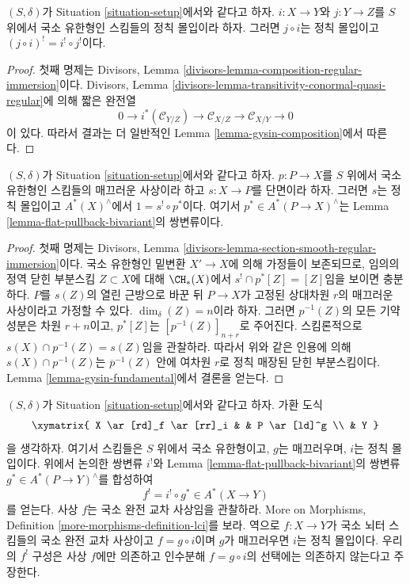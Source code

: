 \begin{lemma}
\label{lemma-composition-regular-immersion}
$(S, \delta)$가 Situation \ref{situation-setup}에서와 같다고 하자.
$i : X \to Y$와 $j : Y \to Z$를 $S$ 위에서 국소 유한형인 스킴들의
정칙 몰입이라 하자. 그러면 $j \circ i$는 정칙 몰입이고
$(j \circ i)^! = i^! \circ j^!$이다.
\end{lemma}

\begin{proof}
첫째 명제는 Divisors, Lemma
\ref{divisors-lemma-composition-regular-immersion}이다. Divisors,
Lemma \ref{divisors-lemma-transitivity-conormal-quasi-regular}에 의해
짧은 완전열
$$
0 \to
i^*(\mathcal{C}_{Y/Z}) \to
\mathcal{C}_{X/Z} \to
\mathcal{C}_{X/Y} \to 0
$$
이 있다. 따라서 결과는 더 일반적인 Lemma
\ref{lemma-gysin-composition}에서 따른다.
\end{proof}

\begin{lemma}
\label{lemma-section-smooth}
$(S, \delta)$가 Situation \ref{situation-setup}에서와 같다고 하자.
$p : P \to X$를 $S$ 위에서 국소 유한형인 스킴들의 매끄러운 사상이라
하고 $s : X \to P$를 단면이라 하자. 그러면 $s$는 정칙 몰입이고
$A^*(X)^\wedge$에서 $1 = s^! \circ p^*$이다. 여기서
$p^* \in A^*(P \to X)^\wedge$는 Lemma
\ref{lemma-flat-pullback-bivariant}의 쌍변류이다.
\end{lemma}

\begin{proof}
첫째 명제는 Divisors, Lemma
\ref{divisors-lemma-section-smooth-regular-immersion}이다. 국소 유한형인
밑변환 $X' \to X$에 의해 가정들이 보존되므로, 임의의 정역 닫힌
부분스킴 $Z \subset X$에 대해 $\CH_*(X)$에서
$s^! \cap p^*[Z] = [Z]$임을 보이면 충분하다. $P$를 $s(Z)$의 열린
근방으로 바꾼 뒤 $P \to X$가 고정된 상대차원 $r$의 매끄러운 사상이라고
가정할 수 있다. $\dim_\delta(Z) = n$이라 하자. 그러면
$p^{-1}(Z)$의 모든 기약 성분은 차원 $r + n$이고, $p^*[Z]$는
$[p^{-1}(Z)]_{n + r}$로 주어진다. 스킴론적으로
$s(X) \cap p^{-1}(Z) = s(Z)$임을 관찰하라. 따라서 위와 같은 인용에
의해 $s(X) \cap p^{-1}(Z)$는 $\overline{p}^{-1}(Z)$ 안에 여차원 $r$로
정칙 매장된 닫힌 부분스킴이다. Lemma
\ref{lemma-gysin-fundamental}에서 결론을 얻는다.
\end{proof}

\noindent
$(S, \delta)$가 Situation \ref{situation-setup}에서와 같다고 하자.
가환 도식
$$
\xymatrix{
X \ar[rd]_f \ar[rr]_i & & P \ar[ld]^g \\
& Y
}
$$
을 생각하자. 여기서 스킴들은 $S$ 위에서 국소 유한형이고, $g$는
매끄러우며, $i$는 정칙 몰입이다. 위에서 논의한 쌍변류 $i^!$와 Lemma
\ref{lemma-flat-pullback-bivariant}의 쌍변류
$g^* \in A^*(P \to Y)^\wedge$를 합성하여
$$
f^! = i^! \circ g^* \in A^*(X \to Y)
$$
를 얻는다. 사상 $f$는 국소 완전 교차 사상임을 관찰하라. More on
Morphisms, Definition \ref{more-morphisms-definition-lci}를 보라. 역으로
$f : X \to Y$가 국소 뇌터 스킴들의 국소 완전 교차 사상이고
$f = g \circ i$이며 $g$가 매끄러우면 $i$는 정칙 몰입이다. 우리의
$f^!$ 구성은 사상 $f$에만 의존하고 인수분해 $f = g \circ i$의 선택에는
의존하지 않는다고 주장한다.


